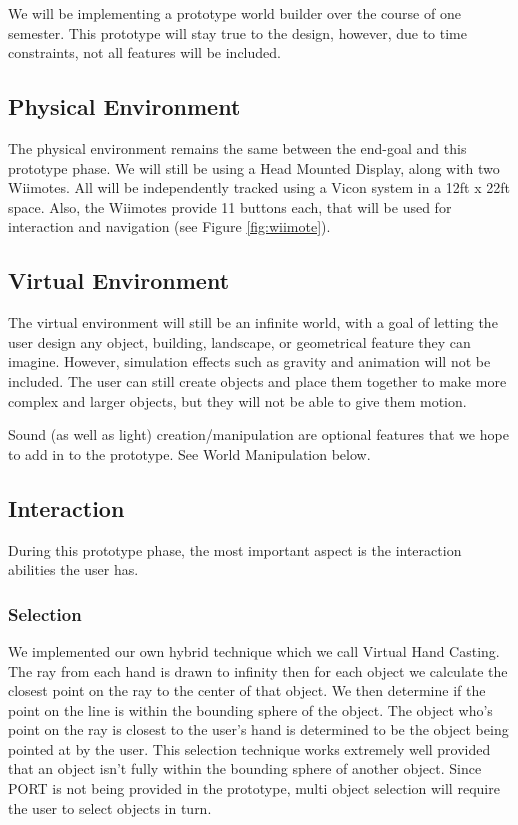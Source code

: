 We will be implementing a prototype world builder over the course of one semester.
This prototype will stay true to the design, however, due to time constraints, not all features will be included.

\subsection{Physical Environment}
The physical environment remains the same between the end-goal and this prototype phase.
We will still be using a Head Mounted Display, along with two Wiimotes.
All will be independently tracked using a Vicon system in a 12ft x 22ft space.
Also, the Wiimotes provide 11 buttons each, that will be used for interaction and navigation (see Figure \ref{fig:wiimote}).

\subsection{Virtual Environment}
The virtual environment will still be an infinite world, with a goal of letting the user design any object, building, landscape, or geometrical feature they can imagine.
However, simulation effects such as gravity and animation will not be included.
The user can still create objects and place them together to make more complex and larger objects, but they will not be able to give them motion.

Sound (as well as light) creation/manipulation are optional features that we hope to add in to the prototype.  See World Manipulation below.

\subsection{Interaction}
During this prototype phase, the most important aspect is the interaction abilities the user has.

\subsubsection{Selection}
We implemented our own hybrid technique which we call Virtual Hand Casting.
The ray from each hand is drawn to infinity then for each object we calculate the closest point on the ray to the center of that object.
We then determine if the point on the line is within the bounding sphere of the object.
The object who's point on the ray is closest to the user's hand is determined to be the object being pointed at by the user.
This selection technique works extremely well provided that an object isn't fully within the bounding sphere of another object.
Since PORT is not being provided in the prototype, multi object selection will require the user to select objects in turn.

